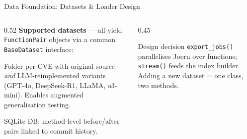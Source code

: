 \documentclass[aspectratio=169,10pt]{beamer}
\begin{document}
\begin{frame}{Data Foundation: Datasets \& Loader Design}
\begin{columns}[T]
\begin{column}{0.52\textwidth}
  \textbf{Supported datasets} — all yield \texttt{FunctionPair}
  objects via a common \texttt{BaseDataset} interface:

  \vspace{0.6em}
  \begin{description}
    \item[\textbf{AutoPatch}] Folder-per-CVE with original source
      \emph{and} LLM-reimplemented variants
      (GPT-4o, DeepSeek-R1, LLaMA, o3-mini).
      Enables augmented generalisation testing.
    \item[\textbf{CVEFixes} (Optional)] SQLite DB; method-level before/after
      pairs linked to commit history.
  \end{description}

  
\end{column}
\begin{column}{0.45\textwidth}
  \begin{block}{Design decision}
    \texttt{export\_jobs()} parallelises Joern over functions;
    \texttt{stream()} feeds the index builder.
    Adding a new dataset = one class, two methods.
  \end{block}
\end{column}
\end{columns}
\end{frame}
\end{document}
